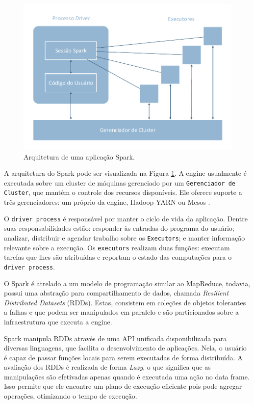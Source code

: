 \begin{figure}[H]
 \centerline{\includegraphics[width=1\textwidth]{./img/spark-arch.pdf}}
 \caption{Arquitetura de uma aplicação Spark.}
 \label{fig:spark-arch}
\end{figure}

A arquitetura do Spark pode ser visualizada na Figura \ref{fig:spark-arch}. A 
engine usualmente é executada sobre um cluster de máquinas gerenciado por um 
\texttt{Gerenciador de Cluster}, que mantém o controle dos recursos 
disponíveis. Ele oferece suporte a três gerenciadores: um próprio da engine, 
Hadoop YARN ou Mesos \cite{ref:mesos}.


O \texttt{driver process} é responsável por manter o ciclo de vida da 
aplicação. Dentre suas responsabilidades estão: responder às entradas do 
programa do usuário; analizar, distribuir e agendar trabalho sobre os 
\texttt{Executors}; e manter informação relevante sobre a execução. Os 
\texttt{executors} realizam duas funções: executam tarefas que lhes são 
atribuídas e reportam o estado das computações para o \texttt{driver process}.

O Spark é atrelado a um modelo de programação similar ao MapReduce, todavia, 
possui uma abstração para compartilhamento de dados, chamada \emph{Resilient 
Distributed Datasets} (RDDs). Estas, consistem em coleções de objetos tolerantes 
a falhas e que podem ser manipulados em paralelo e são particionados sobre a 
infraestrutura que executa a engine. 

Spark manipula RDDs através de uma API unificada disponibilizada para diversas 
linguagens, que facilita o desenvolvimento de aplicações. Nela, o usuário é 
capaz de passar funções locais para serem executadas de forma distribuída. A 
avaliação dos RDDs é realizada de forma \emph{Lazy}, o que significa que as 
manipulações são efetivadas apenas quando é executada uma ação no data frame. 
Isso permite que ele encontre um plano de execução eficiente pois pode agregar 
operações, otimizando o tempo de execução.





